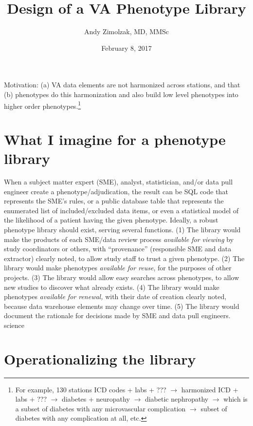 \documentclass{tufte-handout}
\title{Design of a VA Phenotype Library}
\author{Andy Zimolzak, MD, MMSc}
\date{February 8, 2017}
\begin{document}
\maketitle

Motivation: (a) VA data elements are not harmonized across stations,
and that (b) phenotypes do this harmonization and also build low level
phenotypes into higher order phenotypes.\footnote{For example, 130
  stations ICD codes + labs + ??? $\to$ harmonized ICD + labs + ???
  $\to$ diabetes + neuropathy $\to$ diabetic nephropathy $\to$ which
  is a subset of diabetes with any microvascular complication $\to$
  subset of diabetes with any complication at all, etc.}

\section{What I imagine for a phenotype library}

When a subject matter expert (SME), analyst, statistician, and/or data
pull engineer create a phenotype/adjudication, the result can be SQL
code that represents the SME's rules, or a public database table that
represents the enumerated list of included/excluded data items, or
even a statistical model of the likelihood of a patient having the
given phenotype. Ideally, a robust phenotype library should exist,
serving several functions. (1) The library would make the products of
each SME/data review process \emph{available for viewing} by study
coordinators or others, with ``provenance'' (responsible SME and data
extractor) clearly noted, to allow study staff to trust a given
phenotype. (2) The library would make phenotypes \emph{available for
  reuse}, for the purposes of other projects. (3) The library would
allow easy searches across phenotypes, to allow new studies to
discover what already exists. (4) The library would make phenotypes
\emph{available for renewal,} with their date of creation clearly
noted, because data warehouse elements may change over time. (5) The
library would document the rationale for decisions made by SME and
data pull engineers.%
science

\section{Operationalizing the library}
\end{document}

